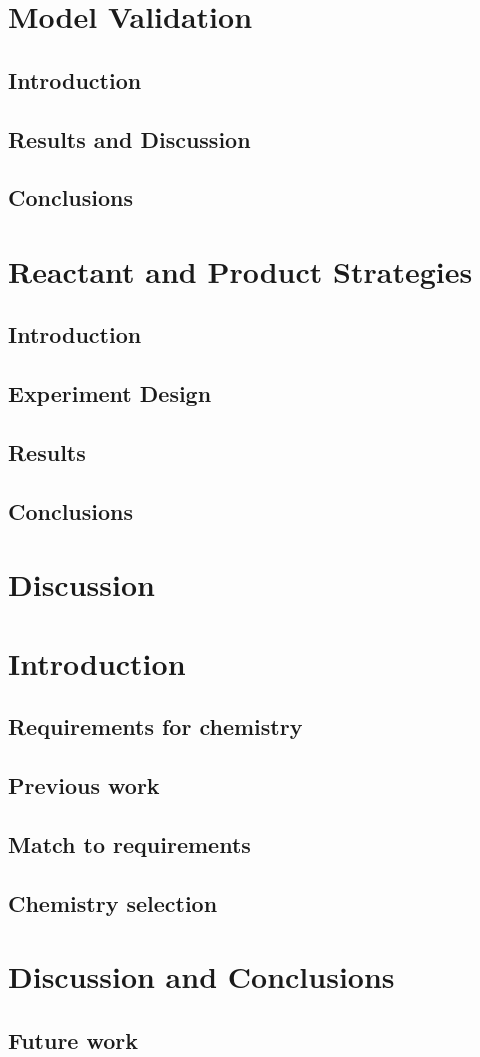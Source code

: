 \documentclass[]{report}
\begin{document}
\chapter{Model Validation}
\section{Introduction}
\section{Results and Discussion}
\section{Conclusions}

\chapter{Reactant and Product Strategies}
\section{Introduction}
\section{Experiment Design}
\section{Results}
\section{Conclusions}

\chapter{Discussion}

\chapter{Introduction}
\section{Requirements for chemistry}
\section{Previous work}
\section{Match to requirements}
\section{Chemistry selection}

\chapter{Discussion and Conclusions}
\section{Future work}
\end{document}
